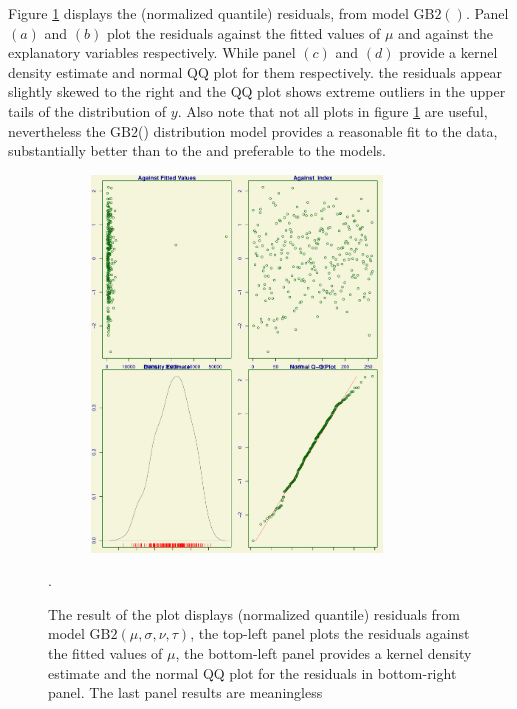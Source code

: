 \documentclass{DissertateUSU}
\begin{document}
Figure \ref{4Residual_GOF_plot} displays the (normalized quantile)
residuals, from model \(\mbox{GB}2()\). Panel \((a)\) and \((b)\) plot
the residuals against the fitted values of \(\mu\) and against the
explanatory variables respectively. While panel \((c)\) and \((d)\)
provide a kernel density estimate and normal \(\mbox{QQ}\) plot for them
respectively. the residuals appear slightly skewed to the right and the
\(\mbox{QQ}\) plot shows extreme outliers in the upper tails of the
distribution of \(y\). Also note that not all plots in figure
\ref{4Residual_GOF_plot} are useful, nevertheless the \(\mbox{GB}2\)()
distribution model provides a reasonable fit to the data, substantially
better than to the and preferable to the models.

\begin{figure}
\centering
\includegraphics[height=10cm, width=10cm]{4_GOF_plot.pdf}
\caption[Normalized quantile residuals from model $\mbox{GB}2$]{The result of the plot displays (normalized quantile) residuals from model $\mbox{GB}2(\mu,\sigma,\nu,\tau)$, the top-left panel plots the residuals against the fitted values of $\mu$, the bottom-left panel provides a kernel density estimate and the normal QQ plot for the residuals in bottom-right panel. The last panel results are meaningless}.
\label{4Residual_GOF_plot}
\end{figure}

\singlespacing

\doublespacing
\end{document}
